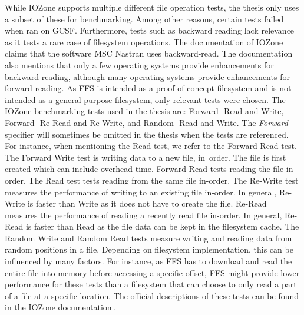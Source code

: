 While IOZone supports multiple different file operation tests, the thesis only uses a subset of these for benchmarking. Among other reasons, certain tests failed when ran on \gls{GCSF}. Furthermore, tests such as backward reading lack relevance as it tests a rare case of filesystem operations. The documentation of IOZone\,\cite{iozoneIozoneFilesystemBenchmark} claims that the software MSC Nastran uses \mbox{backward-read}. The documentation also mentions that only a few operating systems provide enhancements for backward reading, although many operating systems provide enhancements for \mbox{forward-reading}. As \gls{FFS} is intended as a \mbox{proof-of-concept} filesystem and is not intended as a \mbox{general-purpose} filesystem, only relevant tests were chosen. The IOZone benchmarking tests used in the thesis are: Forward- Read and Write, Forward- \mbox{Re-Read} and \mbox{Re-Write}, and Random- Read and Write. The \textit{Forward} specifier will sometimes be omitted in the thesis when the tests are referenced. For instance, when mentioning the Read test, we refer to the Forward Read test. The Forward Write test is writing data to a new file, \mbox{in order}. The file is first created which can include overhead time. Forward Read tests reading the file in order. The Read test tests reading from the same file \mbox{in-order}. The \mbox{Re-Write} test measures the performance of writing to an existing file \mbox{in-order}. In general, \mbox{Re-Write} is faster than Write as it does not have to create the file. \mbox{Re-Read} measures the performance of reading a recently read file \mbox{in-order}. In general, \mbox{Re-Read} is faster than \mbox{Read} as the file data can be kept in the filesystem cache. The Random Write and Random Read tests measure writing and reading data from random positions in a file. Depending on filesystem implementation, this can be influenced by many factors. For instance, as \gls{FFS} has to download and read the entire file into memory before accessing a specific offset, \gls{FFS} might provide lower performance for these tests than a filesystem that can choose to only read a part of a file at a specific location. The official descriptions of these tests can be found in the IOZone documentation\,\cite{iozoneIozoneFilesystemBenchmark}.

